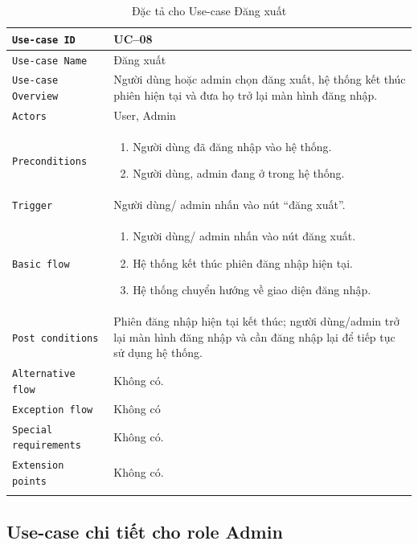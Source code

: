 \begin{longtable}{|P{4.8cm}|m{10cm}|}\hline
	\texttt{Use-case ID} & UC--08\\
	\hline
	\texttt{Use-case Name} & Đăng xuất\\
	\hline
	\texttt{Use-case Overview} & Người dùng hoặc admin chọn đăng xuất, hệ thống kết thúc phiên hiện tại và đưa họ trở lại màn hình đăng nhập.
	\\
	\hline
	\texttt{Actors} & User, Admin
	\\
	\hline
	\texttt{Preconditions} &
	\begin{enumerate}[label = \arabic*.]
		\item Người dùng đã đăng nhập vào hệ thống.
		\item Người dùng, admin đang ở trong hệ thống.
	\end{enumerate}
	\\
	\hline
	\texttt{Trigger} & Người dùng/ admin nhấn vào nút ``đăng xuất''.\\
	\hline
	\texttt{Basic flow} &
	\begin{enumerate}
		\item Người dùng/ admin nhấn vào nút đăng xuất.
		\item Hệ thống kết thúc phiên đăng nhập hiện tại.
		\item Hệ thống chuyển hướng về giao diện đăng nhập.
	\end{enumerate}
	\\
	\hline
	\texttt{Post conditions} &
	Phiên đăng nhập hiện tại kết thúc; người dùng/admin trở lại màn hình đăng nhập và cần đăng nhập lại để tiếp tục sử dụng hệ thống.
	\\
	\hline
	\texttt{Alternative flow} & Không có.\\
	\hline
	\texttt{Exception flow} &
	Không có
	\\
	\hline
	\texttt{Special requirements} & Không có.\\
	\hline
	\texttt{Extension points} & Không có.\\
	\hline

	\caption{\label{table9}Đặc tả cho Use-case Đăng xuất}
\end{longtable}
\subsection{Use-case chi tiết cho role Admin}
